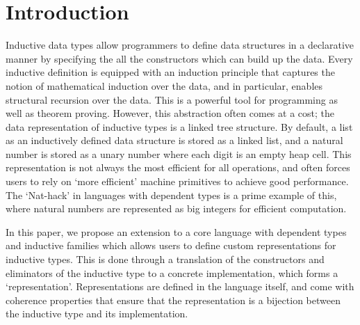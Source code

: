 \section{Introduction}\label{sec:intro}

Inductive data types allow programmers to define data structures in a
declarative manner by specifying the all the constructors which can build up the
data. Every inductive definition is equipped with an induction principle that
captures the notion of mathematical induction over the data, and in particular,
enables structural recursion over the data. This is a powerful tool for
programming as well as theorem proving. However, this abstraction often comes at
a cost; the data representation of inductive types is a linked tree structure.
By default, a list as an inductively defined data structure is stored as a
linked list, and a natural number is stored as a unary number where each digit
is an empty heap cell. This representation is not always the most efficient for
all operations, and often forces users to rely on `more efficient' machine
primitives to achieve good performance. The `Nat-hack' in languages with
dependent types is a prime example of this, where natural numbers are
represented as big integers for efficient computation.

In this paper, we propose an extension to a core language with dependent types
and inductive families which allows users to define custom representations for
inductive types. This is done through a translation of the constructors and
eliminators of the inductive type to a concrete implementation, which forms a
`representation'. Representations are defined in the language itself, and come
with coherence properties that ensure that the representation is a bijection
between the inductive type and its implementation.




